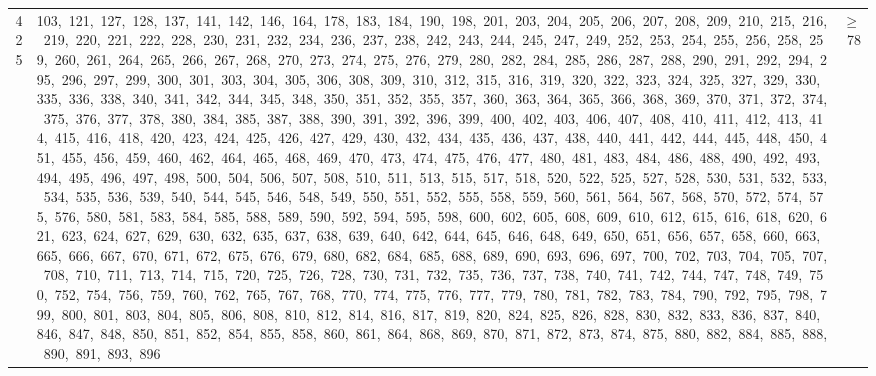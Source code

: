 \begin{longtable}{c|p{}|r}
425 & 103,\ 121,\ 127,\ 128,\ 137,\ 141,\ 142,\ 146,\ 164,\ 178,\ 183,\ 184,\ 190,\ 198,\ 201,\ 203,\ 204,\ 205,\ 206,\ 207,\ 208,\ 209,\ 210,\ 215,\ 216,\ 219,\ 220,\ 221,\ 222,\ 228,\ 230,\ 231,\ 232,\ 234,\ 236,\ 237,\ 238,\ 242,\ 243,\ 244,\ 245,\ 247,\ 249,\ 252,\ 253,\ 254,\ 255,\ 256,\ 258,\ 259,\ 260,\ 261,\ 264,\ 265,\ 266,\ 267,\ 268,\ 270,\ 273,\ 274,\ 275,\ 276,\ 279,\ 280,\ 282,\ 284,\ 285,\ 286,\ 287,\ 288,\ 290,\ 291,\ 292,\ 294,\ 295,\ 296,\ 297,\ 299,\ 300,\ 301,\ 303,\ 304,\ 305,\ 306,\ 308,\ 309,\ 310,\ 312,\ 315,\ 316,\ 319,\ 320,\ 322,\ 323,\ 324,\ 325,\ 327,\ 329,\ 330,\ 335,\ 336,\ 338,\ 340,\ 341,\ 342,\ 344,\ 345,\ 348,\ 350,\ 351,\ 352,\ 355,\ 357,\ 360,\ 363,\ 364,\ 365,\ 366,\ 368,\ 369,\ 370,\ 371,\ 372,\ 374,\ 375,\ 376,\ 377,\ 378,\ 380,\ 384,\ 385,\ 387,\ 388,\ 390,\ 391,\ 392,\ 396,\ 399,\ 400,\ 402,\ 403,\ 406,\ 407,\ 408,\ 410,\ 411,\ 412,\ 413,\ 414,\ 415,\ 416,\ 418,\ 420,\ 423,\ 424,\ 425,\ 426,\ 427,\ 429,\ 430,\ 432,\ 434,\ 435,\ 436,\ 437,\ 438,\ 440,\ 441,\ 442,\ 444,\ 445,\ 448,\ 450,\ 451,\ 455,\ 456,\ 459,\ 460,\ 462,\ 464,\ 465,\ 468,\ 469,\ 470,\ 473,\ 474,\ 475,\ 476,\ 477,\ 480,\ 481,\ 483,\ 484,\ 486,\ 488,\ 490,\ 492,\ 493,\ 494,\ 495,\ 496,\ 497,\ 498,\ 500,\ 504,\ 506,\ 507,\ 508,\ 510,\ 511,\ 513,\ 515,\ 517,\ 518,\ 520,\ 522,\ 525,\ 527,\ 528,\ 530,\ 531,\ 532,\ 533,\ 534,\ 535,\ 536,\ 539,\ 540,\ 544,\ 545,\ 546,\ 548,\ 549,\ 550,\ 551,\ 552,\ 555,\ 558,\ 559,\ 560,\ 561,\ 564,\ 567,\ 568,\ 570,\ 572,\ 574,\ 575,\ 576,\ 580,\ 581,\ 583,\ 584,\ 585,\ 588,\ 589,\ 590,\ 592,\ 594,\ 595,\ 598,\ 600,\ 602,\ 605,\ 608,\ 609,\ 610,\ 612,\ 615,\ 616,\ 618,\ 620,\ 621,\ 623,\ 624,\ 627,\ 629,\ 630,\ 632,\ 635,\ 637,\ 638,\ 639,\ 640,\ 642,\ 644,\ 645,\ 646,\ 648,\ 649,\ 650,\ 651,\ 656,\ 657,\ 658,\ 660,\ 663,\ 665,\ 666,\ 667,\ 670,\ 671,\ 672,\ 675,\ 676,\ 679,\ 680,\ 682,\ 684,\ 685,\ 688,\ 689,\ 690,\ 693,\ 696,\ 697,\ 700,\ 702,\ 703,\ 704,\ 705,\ 707,\ 708,\ 710,\ 711,\ 713,\ 714,\ 715,\ 720,\ 725,\ 726,\ 728,\ 730,\ 731,\ 732,\ 735,\ 736,\ 737,\ 738,\ 740,\ 741,\ 742,\ 744,\ 747,\ 748,\ 749,\ 750,\ 752,\ 754,\ 756,\ 759,\ 760,\ 762,\ 765,\ 767,\ 768,\ 770,\ 774,\ 775,\ 776,\ 777,\ 779,\ 780,\ 781,\ 782,\ 783,\ 784,\ 790,\ 792,\ 795,\ 798,\ 799,\ 800,\ 801,\ 803,\ 804,\ 805,\ 806,\ 808,\ 810,\ 812,\ 814,\ 816,\ 817,\ 819,\ 820,\ 824,\ 825,\ 826,\ 828,\ 830,\ 832,\ 833,\ 836,\ 837,\ 840,\ 846,\ 847,\ 848,\ 850,\ 851,\ 852,\ 854,\ 855,\ 858,\ 860,\ 861,\ 864,\ 868,\ 869,\ 870,\ 871,\ 872,\ 873,\ 874,\ 875,\ 880,\ 882,\ 884,\ 885,\ 888,\ 890,\ 891,\ 893,\ 896 & $\ge$ 78 \\

\end{longtable}
